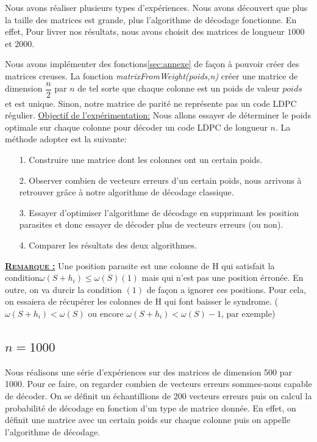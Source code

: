 \documentclass[french,nochapter,11pt]{rapportUB}
\begin{document}
Nous avons réaliser plusieurs types d'expériences. Nous avons découvert que plus la taille des matrices est grande, 
plus l'algorithme de décodage fonctionne. En effet, Pour livrer nos résultats, nous avons choisit des matrices de longueur 
$1000$ et $2000$.

Nous avons implémenter des fonctions\ref{sec:annexe} de façon à pouvoir créer des matrices creuses.
La fonction \textit{matrixFromWeight(poids,n)} créer une matrice de dimension $\dfrac{n}{2}$ par $n$ de tel sorte que 
chaque colonne est un poids de valeur $poids$ et est unique. Sinon, notre matrice de parité ne représente pas un code LDPC régulier.\vspace{0.4cm}\newline
\underline{Objectif de l'expérimentation:} Nous allons essayer de déterminer le poids optimale sur chaque colonne pour décoder un code 
LDPC de longueur $n$.\vspace{0.4cm}\newline
La méthode adopter est la suivante:
\begin{enumerate}
  \item[1.] Construire une matrice dont les colonnes ont un certain poids.
  \item[2.] Observer combien de vecteurs erreurs d'un certain poids, nous arrivons à retrouver grâce à notre algorithme de décodage classique.
  \item[3.] Essayer d'optimiser l'algorithme de décodage en supprimant les position parasites et donc essayer de décoder plus de vecteurs erreurs (ou non).
  \item[4.] Comparer les résultats des deux algorithmes.
\end{enumerate}

\textsc{\textbf{\underline{Remarque :}}} Une position parasite est une colonne de H qui satisfait la condition\newline $\omega(S + h_{i}) \le \omega(S)(1)$ mais qui n'est pas une 
position érronée. En outre, on va durcir la condition $(1)$ de façon a ignorer ces positions. Pour cela, on essaiera de récupérer les colonnes de H qui font baisser le
syndrome. ($\omega(S + h_{i}) < \omega(S)$ ou encore $\omega(S + h_{i}) < \omega(S) - 1$, par exemple)

\subsection{$n = 1000$}
Nous réalisons une série d'expériences sur des matrices de dimension 500 par 1000. Pour ce faire, on regarder combien de vecteurs erreurs
sommes-nous capable de décoder. On se définit un échantillions de 200 vecteurs erreurs puis on calcul la probabilité de décodage en fonction d'un type de matrice donnée.
En effet, on définit une matrice avec un certain poids sur chaque colonne puis on appelle l'algorithme de décodage.\vspace{0.4cm}\newline
\end{document}
